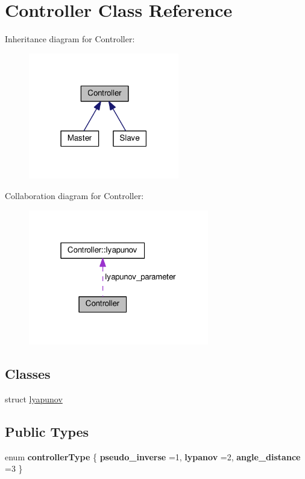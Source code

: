 \hypertarget{classController}{}\section{Controller Class Reference}
\label{classController}


Inheritance diagram for Controller\+:
\nopagebreak
\begin{figure}[H]
\begin{center}
\leavevmode
\includegraphics[width=186pt]{classController__inherit__graph}
\end{center}
\end{figure}


Collaboration diagram for Controller\+:
\nopagebreak
\begin{figure}[H]
\begin{center}
\leavevmode
\includegraphics[width=223pt]{classController__coll__graph}
\end{center}
\end{figure}
\subsection*{Classes}
\begin{DoxyCompactItemize}
\item 
struct \hyperlink{structController_1_1lyapunov}{lyapunov}
\end{DoxyCompactItemize}
\subsection*{Public Types}
\begin{DoxyCompactItemize}
\item 
enum {\bfseries controller\+Type} \{ {\bfseries pseudo\+\_\+inverse} =1, 
{\bfseries lypanov} =2, 
{\bfseries angle\+\_\+distance} =3
 \}\hypertarget{classController_a86221d052db839985bd6e4d73013cd06}{}\label{classController_a86221d052db839985bd6e4d73013cd06}

\end{DoxyCompactItemize}
